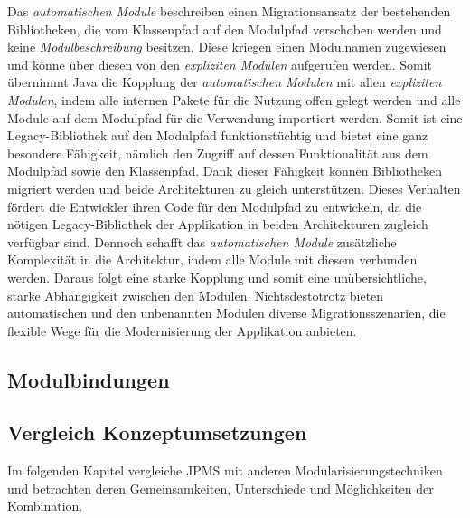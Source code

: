     Das \textit{automatischen Module} beschreiben einen Migrationsansatz der bestehenden Bibliotheken, die vom Klassenpfad auf den Modulpfad verschoben werden und keine \textit{Modulbeschreibung} besitzen. 
    Diese kriegen einen Modulnamen zugewiesen und könne über diesen von den \textit{expliziten Modulen} aufgerufen werden. 
    Somit übernimmt Java die Kopplung der \textit{automatischen Modulen} mit allen \textit{expliziten Modulen}, indem alle internen Pakete für die Nutzung offen gelegt werden und alle Module auf dem Modulpfad für die Verwendung importiert werden.
    Somit ist eine Legacy-Bibliothek auf den Modulpfad funktionstüchtig und bietet eine ganz besondere Fähigkeit, nämlich den Zugriff auf dessen Funktionalität aus dem Modulpfad sowie den Klassenpfad. 
    Dank dieser Fähigkeit können Bibliotheken migriert werden und beide Architekturen zu gleich unterstützen. 
    Dieses Verhalten fördert die Entwickler ihren Code für den Modulpfad zu entwickeln, da die nötigen Legacy-Bibliothek der Applikation in beiden Architekturen zugleich verfügbar sind. 
    Dennoch schafft das \textit{automatischen Module} zusätzliche Komplexität in die Architektur, indem 
    alle Module mit diesem verbunden werden. Daraus folgt eine starke Kopplung und somit eine unübersichtliche, starke Abhängigkeit zwischen den Modulen.
    \newline Nichtsdestotrotz bieten automatischen und den unbenannten Modulen diverse Migrationsszenarien, die flexible Wege für die Modernisierung der Applikation anbieten. 

  


\subsection{Modulbindungen}

\newpage \subsection{Vergleich Konzeptumsetzungen}
  Im folgenden Kapitel vergleiche JPMS mit anderen Modularisierungstechniken und betrachten deren Gemeinsamkeiten, Unterschiede und Möglichkeiten der Kombination. 

